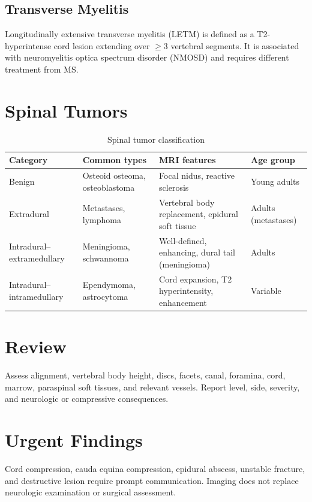 \subsection{Transverse Myelitis}
Longitudinally extensive transverse myelitis (LETM) is defined as a T2-hyperintense cord lesion extending over $\geq 3$ vertebral segments. It is associated with neuromyelitis optica spectrum disorder (NMOSD) and requires different treatment from MS.


\section{Spinal Tumors}
\begin{table}[h]
\centering
\caption{Spinal tumor classification}
\begin{tabular}{p{3cm} p{3.5cm} p{3.5cm} p{3cm}}
\hline
\textbf{Category} & \textbf{Common types} & \textbf{MRI features} & \textbf{Age group} \\
\hline
Benign & Osteoid osteoma, osteoblastoma & Focal nidus, reactive sclerosis & Young adults \\
Extradural & Metastases, lymphoma & Vertebral body replacement, epidural soft tissue & Adults (metastases) \\
Intradural--extramedullary & Meningioma, schwannoma & Well-defined, enhancing, dural tail (meningioma) & Adults \\
Intradural--intramedullary & Ependymoma, astrocytoma & Cord expansion, T2 hyperintensity, enhancement & Variable \\
\hline
\end{tabular}
\end{table}


\section{Review}
Assess alignment, vertebral body height, discs, facets, canal, foramina, cord, marrow, paraspinal soft tissues, and relevant vessels. Report level, side, severity, and neurologic or compressive consequences.

\section{Urgent Findings}
Cord compression, cauda equina compression, epidural abscess, unstable fracture, and destructive lesion require prompt communication. Imaging does not replace neurologic examination or surgical assessment.

\clearpage
